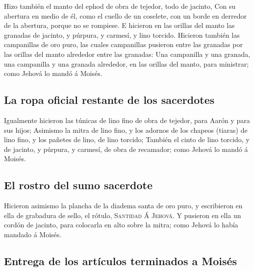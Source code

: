  Hizo también el manto del ephod de obra de tejedor, todo
de jacinto,  Con su abertura en medio de él, como el
cuello de un coselete, con un borde en derredor de la abertura, porque
no se rompiese.  E hicieron en las orillas del manto las
granadas de jacinto, y púrpura, y carmesí, y lino torcido.
 Hicieron también las campanillas de oro puro, las cuales
campanillas pusieron entre las granadas por las orillas del manto
alrededor entre las granadas:  Una campanilla y una
granada, una campanilla y una granada alrededor, en las orillas del
manto, para ministrar; como Jehová lo mandó á Moisés.

\hypertarget{la-ropa-oficial-restante-de-los-sacerdotes}{%
\subsection{La ropa oficial restante de los
sacerdotes}\label{la-ropa-oficial-restante-de-los-sacerdotes}}

 Igualmente hicieron las túnicas de lino fino de obra de
tejedor, para Aarón y para sus hijos;  Asimismo la mitra
de lino fino, y los adornos de los chapeos (tiaras) de lino fino, y los
pañetes de lino, de lino torcido;  También el cinto de
lino torcido, y de jacinto, y púrpura, y carmesí, de obra de recamador;
como Jehová lo mandó á Moisés.

\hypertarget{el-rostro-del-sumo-sacerdote}{%
\subsection{El rostro del sumo
sacerdote}\label{el-rostro-del-sumo-sacerdote}}

 Hicieron asimismo la plancha de la diadema santa de oro
puro, y escribieron en ella de grabadura de sello, el rótulo,
\textsc{Santidad} Á \textsc{Jehová}.  Y pusieron en ella
un cordón de jacinto, para colocarla en alto sobre la mitra; como Jehová
lo había mandado á Moisés.

\hypertarget{entrega-de-los-artuxedculos-terminados-a-moisuxe9s}{%
\subsection{Entrega de los artículos terminados a
Moisés}\label{entrega-de-los-artuxedculos-terminados-a-moisuxe9s}}

